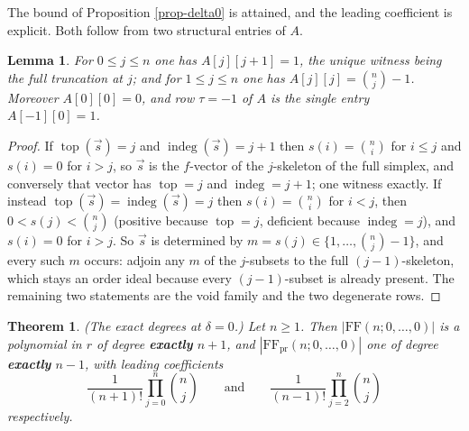 \documentclass[11pt, a4paper, abstract=yes]{scrartcl}
\theoremstyle{definition}
\theoremstyle{remark}
\theoremstyle{plain}
\newtheorem{lemma}[definition]{Lemma}
\newtheorem{theorem}[definition]{Theorem}
\newcommand{\indeg}{\operatorname{indeg}}
\newcommand{\tp}{\operatorname{top}}
\begin{document}
The bound of Proposition \ref{prop-delta0} is attained, and the leading coefficient is explicit. Both
follow from two structural entries of \(A\).

\begin{lemma}
For \(0\le j\le n\) one has \(A[j][j+1]=1\), the unique witness being the full truncation at \(j\);
and for \(1\le j\le n\) one has \(A[j][j]=\binom nj-1\). Moreover \(A[0][0]=0\), and row \(\tau=-1\)
of \(A\) is the single entry \(A[-1][0]=1\).
\label{lem-A-structure}
\end{lemma}

\begin{proof}
If \(\tp(\vec s)=j\) and \(\indeg(\vec s)=j+1\) then \(s(i)=\binom ni\) for \(i\le j\) and \(s(i)=0\)
for \(i>j\), so \(\vec s\) is the \(f\)-vector of the \(j\)-skeleton of the full simplex, and
conversely that vector has \(\tp=j\) and \(\indeg=j+1\); one witness exactly. If instead
\(\tp(\vec s)=\indeg(\vec s)=j\) then \(s(i)=\binom ni\) for \(i<j\), then
\(0<s(j)<\binom nj\) (positive because \(\tp=j\), deficient because \(\indeg=j\)), and
\(s(i)=0\) for \(i>j\). So \(\vec s\) is determined by \(m=s(j)\in\lbrace1,\dots,\binom nj-1\rbrace\),
and every such \(m\) occurs: adjoin any \(m\) of the \(j\)-subsets to the full \((j-1)\)-skeleton,
which stays an order ideal because every \((j-1)\)-subset is already present. The remaining two
statements are the void family and the two degenerate rows.
\end{proof}

\begin{theorem}
(\emph{The exact degrees at \(\delta=0\).}) Let \(n\ge1\). Then \(|\mathrm{FF}(n;0,\dots,0)|\) is a
polynomial in \(r\) of degree \textbf{exactly} \(n+1\), and \(|\mathrm{FF}_{\mathrm{pr}}(n;0,\dots,0)|\) one
of degree \textbf{exactly} \(n-1\), with leading coefficients
\begin{equation}\label{eq:delta0-leading}
  \frac{1}{(n+1)!}\prod_{j=0}^{n}\binom nj
  \qquad\text{and}\qquad
  \frac{1}{(n-1)!}\prod_{j=2}^{n}\binom nj
\end{equation}
respectively.
\label{thm-delta0-degrees}
\end{theorem}
\end{document}
